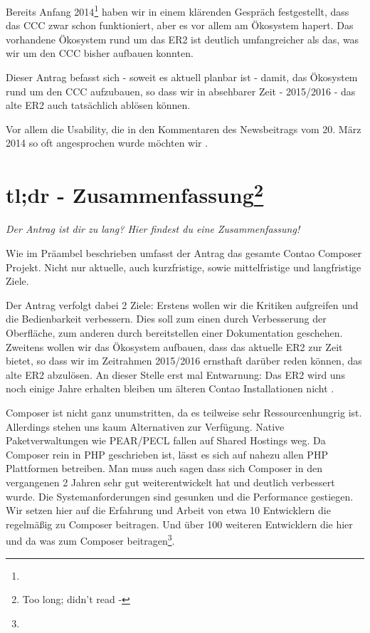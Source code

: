 \documentclass[
paper=a4,
draft=false,%
fontsize=10pt%
]{scrartcl}
\begin{document}
Bereits Anfang 2014\footnote{} haben wir in einem klärenden Gespräch festgestellt, dass das CCC zwar schon funktioniert, aber es vor allem am Ökosystem hapert. Das vorhandene Ökosystem rund um das ER2 ist deutlich umfangreicher als das, was wir um den CCC bisher aufbauen konnten.

Dieser Antrag befasst sich - soweit es aktuell planbar ist - damit, das Ökosystem rund um den CCC aufzubauen, so dass wir in absehbarer Zeit - 2015/2016 - das alte ER2 auch tatsächlich ablösen können.

Vor allem die  Usability, die in den Kommentaren des Newsbeitrags vom 20. März 2014 so oft angesprochen wurde möchten wir .

\pagebreak
\tableofcontents

%
%

\section[tl;dr - Zusammenfassung]{tl;dr - Zusammenfassung\footnote{Too long; didn't read -
}}
\label{sec:summary}

\textit{Der Antrag ist dir zu lang? Hier findest du eine Zusammenfassung!}

Wie im Präambel beschrieben umfasst der Antrag das gesamte Contao Composer Projekt. Nicht nur aktuelle, auch kurzfristige, sowie mittelfristige und langfristige Ziele.

Der Antrag verfolgt dabei 2 Ziele:
Erstens wollen wir die Kritiken aufgreifen und die Bedienbarkeit verbessern. Dies soll zum einen durch Verbesserung der Oberfläche, zum anderen durch bereitstellen einer Dokumentation geschehen.
Zweitens wollen wir das Ökosystem aufbauen, dass das aktuelle ER2 zur Zeit bietet, so dass wir im Zeitrahmen 2015/2016 ernsthaft darüber reden können, das alte ER2 abzulösen. An dieser Stelle erst mal Entwarnung: Das ER2 wird uns noch einige Jahre erhalten bleiben um älteren Contao Installationen nicht .

Composer ist nicht ganz unumstritten, da es teilweise sehr Ressourcenhungrig ist. Allerdings stehen uns kaum Alternativen zur Verfügung. Native Paketverwaltungen wie PEAR/PECL fallen auf Shared Hostings weg. Da Composer rein in PHP geschrieben ist, lässt es sich auf nahezu allen PHP Plattformen betreiben. Man muss auch sagen dass sich Composer in den vergangenen 2 Jahren sehr gut weiterentwickelt hat und deutlich verbessert wurde. Die Systemanforderungen sind gesunken und die Performance gestiegen. Wir setzen hier auf die Erfahrung und Arbeit von etwa 10 Entwicklern die regelmäßig zu Composer beitragen. Und über 100 weiteren Entwicklern die hier und da was zum Composer beitragen\footnote{}.
\end{document}
